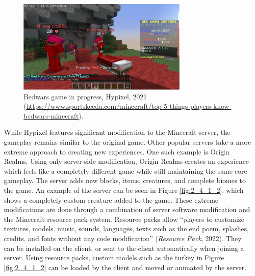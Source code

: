 \documentclass{article}
\begin{document}
\begin{onehalfspacing}
\begin{figure}[h] 
    \centering
    \includegraphics[width=0.75\textwidth]{media/media/image5.png} 
    \caption{Bedwars game in progress, Hypixel, 2021 \\ (\url{https://www.sportskeeda.com/minecraft/top-5-things-players-know-bedwars-minecraft}).
} 
    \label{fig:2_4_1_1} 
\end{figure}


While Hypixel features significant modification to the Minecraft server,
the gameplay remains similar to the original game. Other popular servers
take a more extreme approach to creating new experiences. One such
example is Origin Realms. Using only server-side modification, Origin
Realms creates an experience which feels like a completely different
game while still maintaining the same core gameplay. The server adds new
blocks, items, creatures, and complete biomes to the game. An example of
the server can be seen in Figure \ref{fig:2_4_1_2}, which shows a completely
custom creature added to the game. These extreme modifications are done
through a combination of server software modification and the Minecraft
resource pack system. Resource packs allow ``players to customize
textures, models, music, sounds, languages, texts such
as the end poem, splashes, credits, and fonts without any code modification'' (\emph{Resource Pack}, 2022). 
They can be installed on the client, or sent to the client automatically when joining a server.
Using resource packs, custom models such as the turkey in Figure \ref{fig:2_4_1_2} can be loaded by the client and moved or animated by the server.


\end{onehalfspacing}
\end{document}

